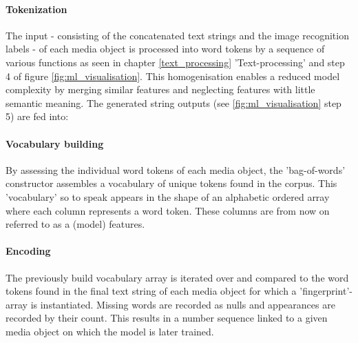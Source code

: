 \paragraph*{Tokenization} The input - consisting of the concatenated text strings and the image recognition labels - of each media object is processed into word tokens by a sequence of various functions as seen in chapter \ref{text_processing} 'Text-processing' and step 4 of figure \ref{fig:ml_visualisation}. This homogenisation enables a reduced model complexity by merging similar features and neglecting features with little semantic meaning. The generated string outputs (see \ref{fig:ml_visualisation} step 5) are fed into:

\paragraph*{Vocabulary building} By assessing the individual word tokens of each media object, the 'bag-of-words' constructor assembles a vocabulary of unique tokens found in the corpus. This 'vocabulary' so to speak appears in the shape of an alphabetic ordered array where each column represents a word token. These columns are from now on referred to as a (model) features.

\paragraph*{Encoding} The previously build vocabulary array is iterated over and compared to the word tokens found in the final text string of each media object for which a 'fingerprint'-array is instantiated. Missing words are recorded as nulls and appearances are recorded by their count. This results in a number sequence linked to a given media object on which the model is later trained.

\vspace{2cm}


